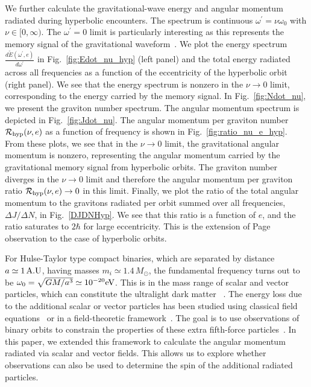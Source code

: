 \documentclass[aps,prd]{revtex4-2}
\begin{document}
We further calculate the gravitational-wave energy and angular momentum radiated during hyperbolic encounters. The spectrum is continuous $\omega^\prime= \nu \omega_0$ with $\nu \in [0,\infty)$. The $\omega^\prime=0$ limit is particularly interesting as this represents the memory signal of the gravitational waveform~\cite{Hait:2022ukn}. We plot the energy spectrum $\frac{d\tilde E(\omega^\prime, e)}{d\omega^\prime}$ in Fig.~\ref{fig:Edot_nu_hyp} (left panel) and the total energy radiated across
all frequencies as a function of the eccentricity of the hyperbolic orbit (right panel). We see that the energy spectrum is nonzero in the $\nu\rightarrow 0$ limit, corresponding to the energy carried by the memory signal. In Fig.~\ref{fig:Ndot_nu}, we present the graviton number spectrum. The angular momentum spectrum is depicted in Fig.~\ref{fig:Jdot_nu}. The angular momentum per graviton number $\mathcal{R}_{\rm hyp}(\nu, e)$ as a function of frequency is shown in Fig.~\ref{fig:ratio_nu_e_hyp}. From these plots, we see that in the $\nu \rightarrow 0$ limit, the gravitational angular momentum is nonzero, representing the angular momentum carried by the gravitational memory signal from hyperbolic orbits. The graviton number diverges in the $\nu\rightarrow 0$ limit and therefore the angular momentum per graviton ratio $\mathcal{R}_{\rm hyp}(\nu, e) \rightarrow 0$ in this limit. Finally, we plot the ratio of the total angular momentum to the gravitons radiated per orbit summed over all frequencies, $\Delta J/\Delta N$, in Fig.~\ref{DJDNHyp}. We see that this ratio is a function of $e$, and the ratio saturates to $2\hbar$ for large eccentricity. This is the extension of Page~\cite{Page:2025ncu} observation to the case of hyperbolic orbits.

For Hulse-Taylor type compact binaries, which are separated by distance $a\simeq 1\, {\rm A.U}$, having masses $m_i\simeq 1.4\, M_\odot$, the fundamental frequency turns out to be $\omega_0=\sqrt{GM/a^3} \simeq 10^{-20} {\rm eV}$. This is in the mass range of scalar and vector particles, which can constitute the ultralight dark matter ~\cite{Hu:2000ke, Hui:2016ltb, Schive:2025bcm}. The energy loss due to the additional scalar or vector particles has been studied using classical field equations~\cite{Krause:1994ar, Chen:2025mwl} or in a field-theoretic framework~\cite{Mohanty:1994yi, KumarPoddar:2019jxe, Poddar:2023pfj, KumarPoddar:2019ceq}. The goal is to use observations of binary orbits to constrain the properties of these extra fifth-force particles~\cite{Seymour:2020yle, Cheng:2023qys}. In this paper, we extended this framework to calculate the angular momentum radiated via scalar and vector fields. This allows us to explore whether observations can also be used to determine the spin of the additional radiated particles.
\end{document}
